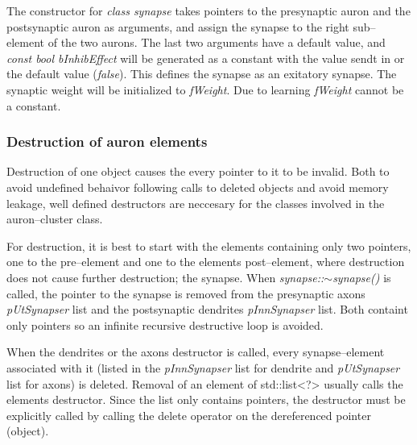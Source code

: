 	The constructor for \emph{class synapse} takes pointers to the presynaptic auron and the postsynaptic auron as arguments, and assign the synapse to the right sub--element of the two aurons. 
	The last two arguments have a default value, and \emph{const bool bInhibEffect} will be generated as a constant with the value sendt in or the default value (\emph{false}). This defines the synapse as an exitatory synapse. 
	The synaptic weight will be initialized to \emph{fWeight}. Due to learning \emph{fWeight} cannot be a constant.



	\subsubsection{Destruction of auron elements}
	Destruction of one object causes the every pointer to it to be invalid. 
	Both to avoid undefined behaivor following calls to deleted objects and avoid memory leakage, well defined destructors are neccesary for the classes involved in the auron--cluster class.

	For destruction, it is best to start with the elements containing only two pointers, one to the pre--element and one to the elements post--element, where destruction does not cause further destruction; the synapse.
	When \emph{synapse::$\sim$synapse()} is called, the pointer to the synapse is removed from the presynaptic axons \emph{pUtSynapser} list and the postsynaptic dendrites \emph{pInnSynapser} list. 
	Both containt only pointers so an infinite recursive destructive loop is avoided. %

	When the dendrites or the axons destructor is called, every synapse--element associated with it (listed in the \emph{pInnSynapser} list for dendrite and \emph{pUtSynapser} list for axons) is deleted. 
	Removal of an element of std::list<?> usually calls the elements destructor. Since the list only contains pointers, the destructor must be explicitly called by calling the delete operator on the dereferenced pointer (object).

